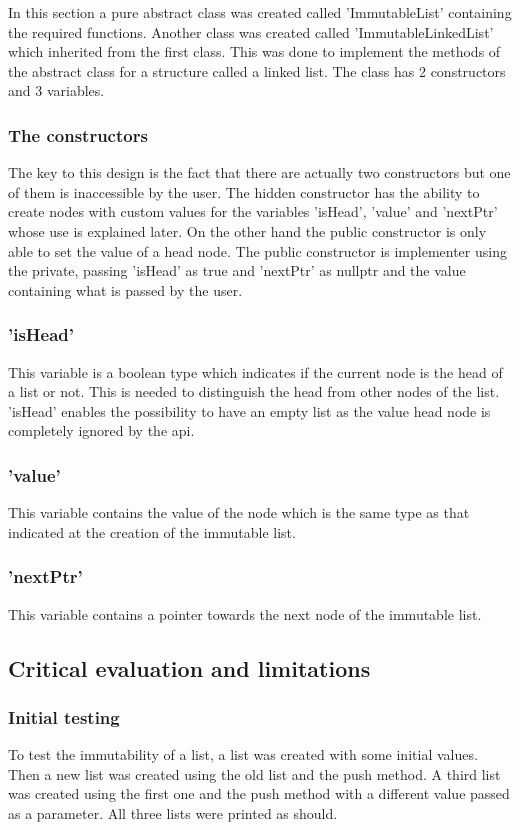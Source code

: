 \documentclass[a4paper, 12pt]{report}
\begin{document}
In this section a pure abstract class was created called 'ImmutableList' containing the required functions.  Another class was created called 'ImmutableLinkedList' which inherited from the first class. This was done to implement the methods of the abstract class for a structure called a linked list. The class has 2 constructors and 3 variables.

\subsubsection{The constructors}
The key to this design is the fact that there are actually two constructors but one of them is inaccessible by the user. The hidden constructor has the ability to create nodes with custom values for the variables 'isHead', 'value' and 'nextPtr' whose use is explained later. On the other hand the public constructor is only able to set the value of a head node. The public constructor is implementer using the private, passing 'isHead' as true and 'nextPtr' as nullptr and the value containing what is passed by the user.

\subsubsection{'isHead'}
This variable is a boolean type which indicates if the current node is the head of a list or not. This is needed to distinguish the head from other nodes of the list.  'isHead' enables the possibility to have an empty list as the value head node is completely ignored by the api.

\subsubsection{'value'}
This variable contains the value of the node which is the same type as that indicated at the creation of the immutable list.

\subsubsection{'nextPtr'}
This variable contains a pointer towards the next node of the immutable list.

\subsection{Critical evaluation and limitations}
\subsubsection{Initial testing}
To test the immutability of a list, a list was created with some initial values. Then a new list was created using the old list and the push method. A third list was created using the first one and the push method with a different value passed as a parameter. All three lists were printed as should.
\end{document}
